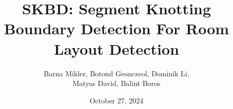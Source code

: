 \documentclass{article}      %
\title{SKBD: Segment Knotting Boundary Detection For Room Layout Detection}
\author{Barna Mikler, Botond Geonczeol, Dominik Li, \\ Matyas David, Balint Boros}
\date{October 27, 2024}
\begin{document}

\maketitle                   %

















\listoffigures

\listoftables

\listofalgorithms

\printbibliography           %
\end{document}
